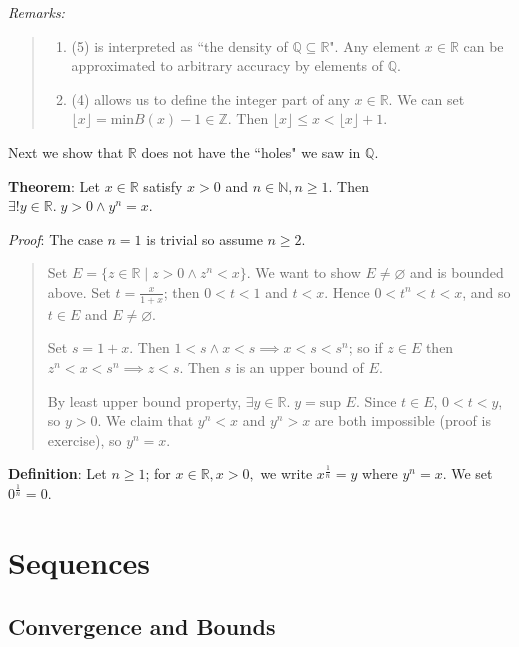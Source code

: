 \documentclass[11pt]{article}
\begin{document}
\emph{Remarks:}
\begin{quote}\vspace{-0.3cm}
	\begin{enumerate}
	\item (5) is interpreted as ``the density of $\mathbb{Q} \subseteq \mathbb{R}$". Any element $x \in \mathbb{R}$ can be approximated to arbitrary accuracy by elements of $\mathbb{Q}$.
	\item (4) allows us to define the integer part of any $x \in \mathbb{R}$. We can set $\lfloor x \rfloor = \text{min} B(x) - 1 \in \mathbb{Z}$. Then $\lfloor x \rfloor \leq x < \lfloor x \rfloor + 1$.
	\end{enumerate}
\end{quote}

Next we show that $\mathbb{R}$ does not have the ``holes" we saw in $\mathbb{Q}$.

\textbf{Theorem}: Let $x \in \mathbb{R}$ satisfy $x > 0$ and $n \in \mathbb{N}, n \geq 1$. Then $\exists ! y \in \mathbb{R}.\; y > 0 \land y^n = x$.

\emph{Proof}: The case $n = 1$ is trivial so assume $n \geq 2$.
\begin{quote}\vspace{-0.3cm}
Set $E = \{z \in \mathbb{R} \;|\; z > 0 \land z^n < x\}$. We want to show $E \neq \varnothing$ and is bounded above. Set $t = \frac{x}{1+x}$; then $0 < t < 1$ and $t < x$. Hence $0 < t^n < t < x$, and so $t \in E$ and $E \neq \varnothing$.

Set $s = 1+x$. Then $1 < s \land x < s \implies x < s < s^n$; so if $z \in E$ then $z^n < x < s^n \implies z < s$. Then $s$ is an upper bound of $E$.

By least upper bound property, $\exists y \in \mathbb{R}.\; y = \text{sup } E$. Since $t \in E$, $0 < t < y$, so $y > 0$. We claim that $y^n < x$ and $y^n > x$ are both impossible (proof is exercise), so $y^n = x$.
\end{quote}

\textbf{Definition}: Let $n \geq 1$; for $x \in \mathbb{R}, x > 0,$ we write $x^{\frac{1}{n}} = y$ where $y^n = x$. We set $0^{\frac{1}{n}} = 0$.

\section{Sequences}

\subsection{Convergence and Bounds}
\end{document}
